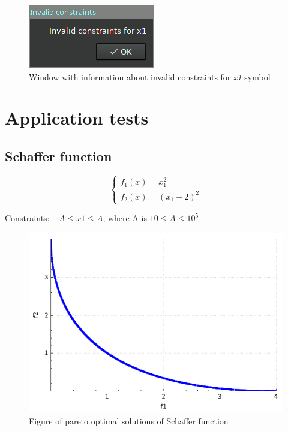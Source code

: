 \documentclass[a4paper, 11pt]{article}
\begin{document}
	\begin{figure}[H]
	\centering
	\includegraphics[scale=0.8]{constraints.png}
	\caption{Window with information about invalid constraints for \textit{x1} symbol}
	\label{fig:constraints}
	\end{figure}	
	
	\newpage
	\section{Application tests}

	\subsection{Schaffer function}
	$$\begin{cases}
		f_{1}(x)=x_{1}^{2}\\
		f_{2}(x)=(x_{1}-2)^{2}
	\end{cases}$$
		
	Constraints: $-A \leq x1 \leq A$, where A is $10 \leq A \leq 10^{5}$
		
	\begin{figure}[H]
	\centering
	\includegraphics[scale=0.4]{schaffer}
	\caption{Figure of pareto optimal solutions of Schaffer function}
	\label{fig:schaffer}
	\end{figure}
	
\end{document}
